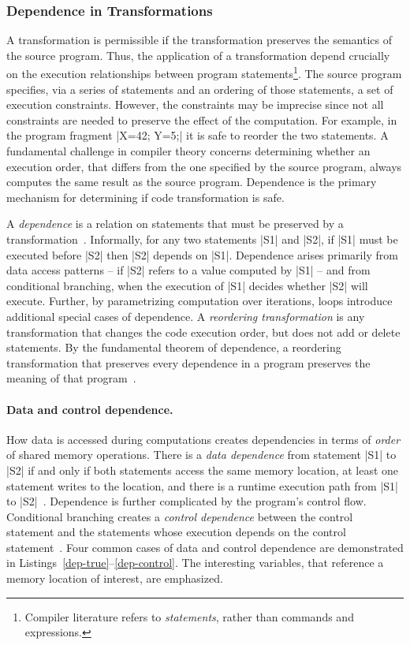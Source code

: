\subsubsection{Dependence in Transformations}
\label{dependence-analysis}

A transformation is permissible if the transformation preserves the semantics of the source program.
Thus, the application of a transformation depend crucially on the execution {relationships} between program statements\footnote{
Compiler literature refers to \emph{statements}, rather than commands and expressions.}.
The source program specifies,  via a series of statements and an ordering of those statements, a set of {execution constraints}.
However, the constraints may be imprecise since not all constraints are needed to preserve the effect of the computation.
For example, in the program fragment \pr|X=42; Y=5;| it is safe to reorder the two statements.
A fundamental challenge in compiler theory concerns determining whether an execution order, that differs from the one specified by the source program,
always computes the same result as the source program.
Dependence is the primary mechanism for determining if code transformation is safe.

A \emph{dependence} is a relation on statements that must be preserved by a transformation~\cite[p. 47]{kennedy2001}.
Informally, for any two statements \pr|S1| and \pr|S2|, if \pr|S1| must be executed before \pr|S2| then \pr|S2| depends on \pr|S1|.
Dependence arises primarily from data access patterns -- if \pr|S2| refers to a value computed by \pr|S1| -- and from conditional branching, when the execution of \pr|S1| decides whether \pr|S2| will execute.
Further, by parametrizing computation over iterations, loops introduce additional special cases of dependence.
A \emph{reordering transformation} is any transformation that changes the code execution order, but does not add or delete statements.
By the fundamental theorem of dependence, a reordering transformation that preserves every dependence in a program preserves the meaning of that program~\cite[p. 66]{kennedy2001}.

\paragraph*{Data and control dependence.}
How data is accessed during computations creates dependencies in terms of \emph{order} of shared memory operations.
There is a \emph{data dependence} from statement \pr|S1| to \pr|S2|
if and only if both statements access the same memory location, at least one statement writes to the location,
and there is a runtime execution path from \pr|S1| to \pr|S2|~\cite[p. 59-60]{kennedy2001}.
Dependence is further complicated by the program's control flow.
Conditional branching creates a \emph{control dependence} between the control statement
and the statements whose execution depends on the control statement~\cite[p. 374]{kennedy2001}.
Four common cases of data and control dependence are demonstrated in Listings~\ref{dep-true}--\ref{dep-control}.
The interesting variables, that reference a memory location of interest, are emphasized.

